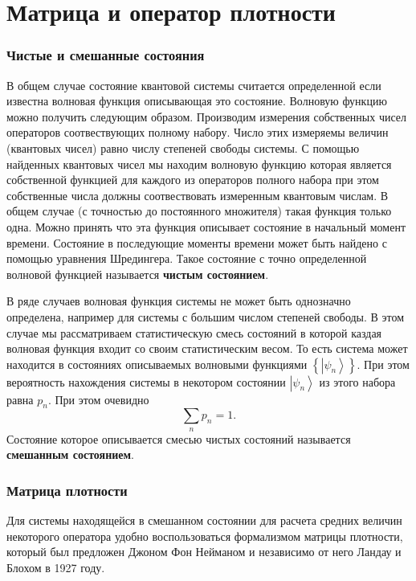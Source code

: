 \chapter{Матрица и оператор плотности}
\label{AddState}

\subsection{Чистые и смешанные состояния}
В общем случае состояние квантовой системы считается определенной если
известна волновая функция описывающая это состояние. Волновую функцию
можно получить следующим образом. Производим измерения собственных
чисел операторов соотвествующих полному набору. Число этих измеряемы
величин (квантовых чисел) равно числу степеней свободы системы. С
помощью найденных квантовых чисел мы находим волновую функцию которая
является собственной функцией для каждого из операторов полного набора
при этом собственные числа должны соотвествовать измеренным квантовым
числам. В общем случае (с точностью до постоянного множителя) такая
функция только одна. Можно принять что эта функция описывает состояние
в начальный момент времени. Состояние в последующие моменты времени
может быть найдено с помощью уравнения Шредингера. Такое состояние с
точно определенной волновой функцией называется 
\textbf{чистым состоянием}.

В ряде случаев волновая функция системы не может быть однозначно
определена, например для системы с большим числом степеней свободы. В
этом случае мы рассматриваем статистическую смесь состояний в которой
каздая волновая функция входит со своим статистическим весом. То есть
система может находится в состояниях описываемых волновыми функциями
\(\left\{\left|\psi_n\right>\right\}\). При этом вероятность
нахождения системы в некотором состоянии \(\left|\psi_n\right>\) из
этого набора равна \(p_n\). При этом очевидно 
\[
\sum_n p_n = 1.
\]
Состояние которое описывается смесью чистых состояний называется
\textbf{смешанным состоянием}.

\subsection{Матрица плотности}
Для системы находящейся в смешанном состоянии для расчета средних
величин некоторого оператора удобно воспользоваться формализмом
матрицы плотности, который  был предложен Джоном Фон Нейманом и
независимо от него Ландау и Блохом в 1927 году.

